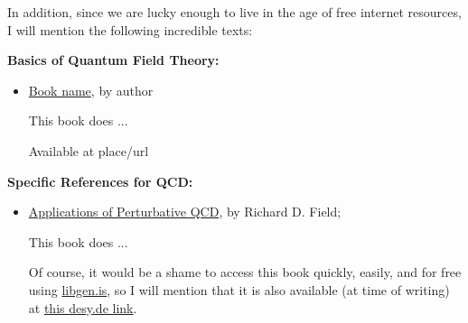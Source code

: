 In addition, since we are lucky enough to live in the age of free internet resources, I will mention the following incredible texts:

\textbf{Basics of Quantum Field Theory:}
\begin{itemize}
    \item
        \underline{Book name}, by {author}

        This book {does ...}

        Available at {place/url}
\end{itemize}


\textbf{Specific References for QCD:}
\begin{itemize}
    \item
        \underline{Applications of Perturbative QCD}, by Richard D. Field;

        This book {does ...}

        Of course, it would be a shame to access this book quickly, easily, and for free using \url{libgen.is}, so I will mention that it is also available (at time of writing) at \href{https://www.desy.de/~jung/qcd_and_mc_2009-2010/R.Field-Applications-of-pQCD.pdf}{this desy.de link}.
\end{itemize}
